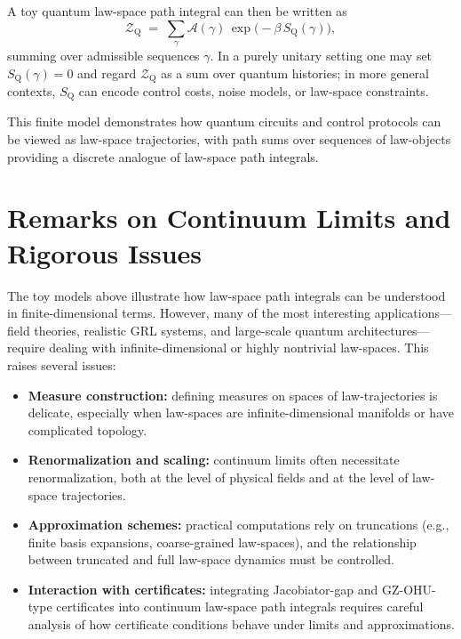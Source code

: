 \documentclass[11pt]{book}
\theoremstyle{plain}
\theoremstyle{definition}
\theoremstyle{remark}
\begin{document}
A toy quantum law-space path integral can then be written as
\[
   \mathcal{Z}_{\mathrm{Q}}
   \;=\;
   \sum_{\gamma}
   \mathcal{A}(\gamma)\,
   \exp\!\bigl(-\beta\,S_{\mathrm{Q}}(\gamma)\bigr),
\]
summing over admissible sequences $\gamma$. In a purely unitary
setting one may set $S_{\mathrm{Q}}(\gamma)=0$ and regard
$\mathcal{Z}_{\mathrm{Q}}$ as a sum over quantum histories; in
more general contexts, $S_{\mathrm{Q}}$ can encode control costs,
noise models, or law-space constraints.

This finite model demonstrates how quantum circuits and control
protocols can be viewed as law-space trajectories, with path sums
over sequences of law-objects providing a discrete analogue of
law-space path integrals.

\section{Remarks on Continuum Limits and Rigorous Issues}
\label{sec:remarks-continuum-rigour}


The toy models above illustrate how law-space path integrals can be
understood in finite-dimensional terms. However, many of the most
interesting applications—field theories, realistic GRL systems,
and large-scale quantum architectures—require dealing with
infinite-dimensional or highly nontrivial law-spaces. This raises
several issues:

\begin{itemize}
  \item \textbf{Measure construction:}
        defining measures on spaces of law-trajectories is
        delicate, especially when law-spaces are infinite-dimensional
        manifolds or have complicated topology.
  \item \textbf{Renormalization and scaling:}
        continuum limits often necessitate renormalization, both
        at the level of physical fields and at the level of
        law-space trajectories.
  \item \textbf{Approximation schemes:}
        practical computations rely on truncations (e.g., finite
        basis expansions, coarse-grained law-spaces), and the
        relationship between truncated and full law-space dynamics
        must be controlled.
  \item \textbf{Interaction with certificates:}
        integrating Jacobiator-gap and GZ-OHU-type certificates into
        continuum law-space path integrals requires careful
        analysis of how certificate conditions behave under limits
        and approximations.
\end{itemize}
\end{document}
